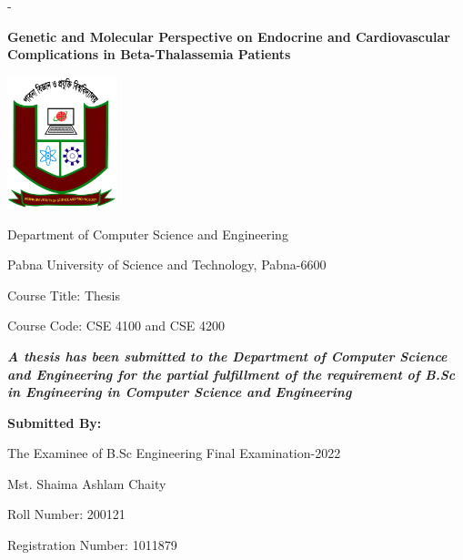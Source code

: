 \setlength{\parskip}{0pt}
%
\begin{titlingpage}
\begin{SingleSpace}
\calccentering{\unitlength} 
\begin{adjustwidth*}{\unitlength}{-\unitlength}

\begin{center}
    {\textbf{Genetic and Molecular Perspective on Endocrine and Cardiovascular Complications in Beta-Thalassemia Patients}}
\end{center}

\vspace{0.5cm}

\begin{center}
\includegraphics[width=32mm]{logos/pust_logo.jpg} %

Department of Computer Science and Engineering

Pabna University of Science and Technology, Pabna-6600

\vspace{0.5cm}

Course Title: Thesis

Course Code: CSE 4100 and CSE 4200


\vspace{0.5cm}

{\em \textbf{A thesis has been submitted to the Department of Computer Science and Engineering for the partial fulfillment of the requirement of B.Sc in Engineering in Computer Science and Engineering}
}

\vspace{1cm}
{\textbf {Submitted By:}}

The Examinee of B.Sc Engineering Final Examination-2022

Mst. Shaima Ashlam Chaity

Roll Number: 200121

Registration Number: 1011879


\end{center}
\end{adjustwidth*}
\end{SingleSpace}
\end{titlingpage}
